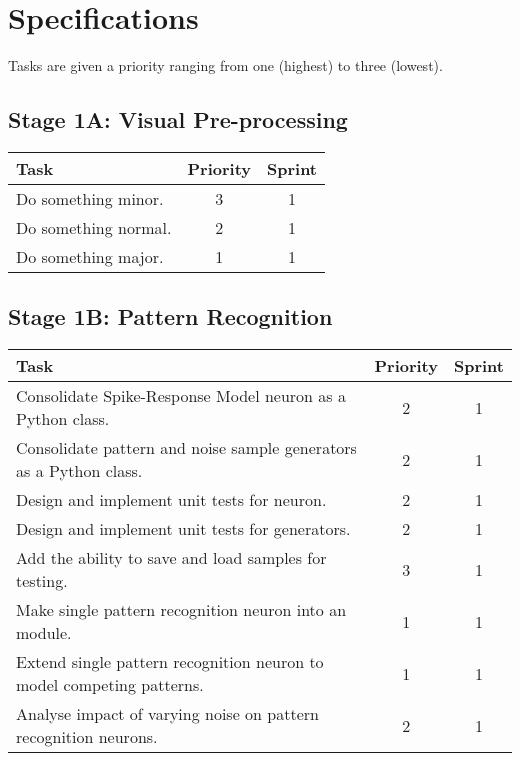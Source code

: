 \documentclass[a4paper,11pt]{article}
\begin{document}
\section{Specifications}
Tasks are given a priority ranging from one (highest) to three (lowest).

\subsection{Stage 1A: Visual Pre-processing}
\begin{center}
    \begin{tabular}{p{12cm} c c}
    \textbf{Task} & \textbf{Priority} & \textbf{Sprint} \\ \hline
	Do something minor. & 3 & 1 \\
	Do something normal. & 2 & 1 \\
	Do something major. & 1 & 1 \\
    \end{tabular}
\end{center}

\subsection{Stage 1B: Pattern Recognition}
\begin{center}
    \begin{tabular}{p{12cm} c c}
    \textbf{Task} & \textbf{Priority} & \textbf{Sprint} \\ \hline
	Consolidate Spike-Response Model neuron as a Python class. & 2 & 1 \\
	Consolidate pattern and noise sample generators as a Python class. & 2 & 1 \\
	Design and implement unit tests for neuron. & 2 & 1 \\
	Design and implement unit tests for generators. & 2 & 1 \\
	Add the ability to save and load samples for testing. & 3 & 1 \\
	Make single pattern recognition neuron into an module. & 1 & 1 \\
	Extend single pattern recognition neuron to model competing patterns. & 1 & 1 \\
	Analyse impact of varying noise on pattern recognition neurons. & 2 & 1 \\
    \end{tabular}
\end{center}
\end{document}
